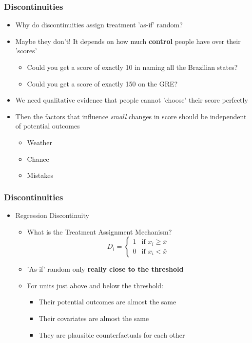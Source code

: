 \documentclass[xcolor=x11names,compress]{beamer}\usepackage[]{graphicx}\usepackage[]{color}
\renewcommand{\(}{\begin{columns}}
\renewcommand{\)}{\end{columns}}
\newcommand{\<}[1]{\begin{column}{#1}}
\renewcommand{\>}{\end{column}}
\begin{document}
\begin{frame}
\frametitle{Discontinuities}
\begin{itemize}
\item Why do discontinuities assign treatment 'as-if' random?
\pause
\item Maybe they don't! \pause It depends on how much \textbf{control} people have over their 'scores'
\pause
\begin{itemize}
\item Could you get a score of exactly 10 in naming all the Brazilian states?
\pause
\item Could you get a score of exactly 150 on the GRE?
\end{itemize}
\pause
\item We need qualitative evidence that people cannot 'choose' their score perfectly
\pause
\item Then the factors that influence \textit{small} changes in score should be independent of potential outcomes
\pause
\begin{itemize}
\item Weather
\item Chance
\item Mistakes
\end{itemize}
\end{itemize}
\end{frame}

\begin{frame}
\frametitle{Discontinuities}
\begin{itemize}
\item Regression Discontinuity
\begin{itemize}
\item What is the Treatment Assignment Mechanism?
\pause
\[
D_i=
\begin{cases}
1 & \text{if }x_i \geq \bar{x} \\
0 & \text{if }x_i < \bar{x}
\end{cases}
\]
\pause
\item 'As-if' random only \textbf{really close to the threshold}
\pause
\item For units just above and below the threshold:
\begin{itemize}
\item Their potential outcomes are almost the same
\pause
\item Their covariates are almost the same
\pause
\item They are plausible counterfactuals for each other
\end{itemize}
\end{itemize}
\end{itemize}
\end{frame}
\end{document}

